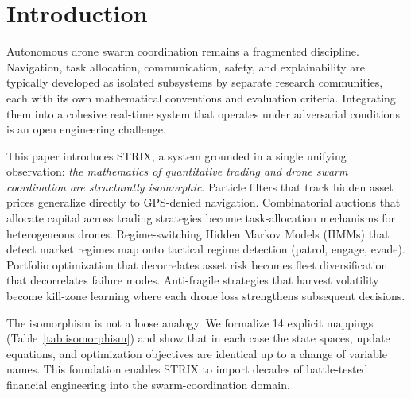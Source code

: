 \documentclass[conference]{IEEEtran}
\begin{document}
\section{Introduction}
\label{sec:intro}

Autonomous drone swarm coordination remains a fragmented discipline.
Navigation, task allocation, communication, safety, and explainability
are typically developed as isolated subsystems by separate research
communities, each with its own mathematical conventions and evaluation
criteria.  Integrating them into a cohesive real-time system that
operates under adversarial conditions is an open engineering challenge.

This paper introduces STRIX, a system grounded in a single unifying
observation: \emph{the mathematics of quantitative trading and drone
swarm coordination are structurally isomorphic}.  Particle filters
that track hidden asset prices generalize directly to GPS-denied
navigation.  Combinatorial auctions that allocate capital across
trading strategies become task-allocation mechanisms for heterogeneous
drones.  Regime-switching Hidden Markov Models (HMMs) that detect
market regimes map onto tactical regime detection (patrol, engage,
evade).  Portfolio optimization that decorrelates asset risk becomes
fleet diversification that decorrelates failure modes.  Anti-fragile
strategies that harvest volatility become kill-zone learning where
each drone loss strengthens subsequent decisions.

The isomorphism is not a loose analogy.  We formalize 14 explicit
mappings (Table~\ref{tab:isomorphism}) and show that in each case the
state spaces, update equations, and optimization objectives are
identical up to a change of variable names.  This foundation enables
STRIX to import decades of battle-tested financial engineering into
the swarm-coordination domain.
\end{document}
